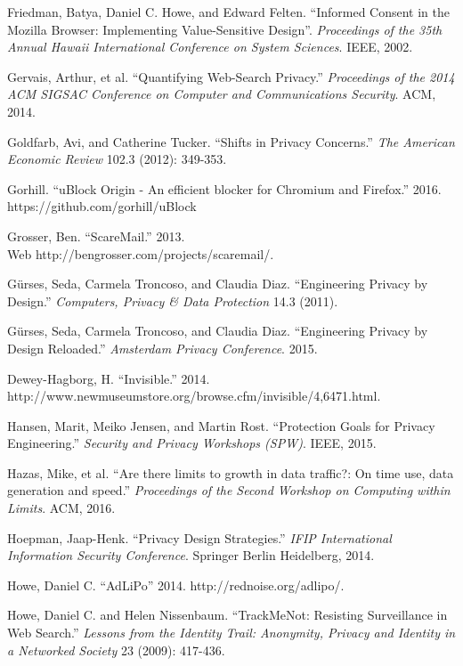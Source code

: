 \documentclass[conference]{IEEEtran}
\begin{document}
\begin{thebibliography}{99}
 Friedman, Batya, Daniel C. Howe, and Edward Felten. “Informed Consent in the Mozilla Browser: Implementing Value-Sensitive Design”. \textit{Proceedings of the 35th Annual Hawaii International Conference on System Sciences}. IEEE, 2002.

 Gervais, Arthur, et al. “Quantifying Web-Search Privacy.” \textit{Proceedings of the 2014 ACM SIGSAC Conference on Computer and Communications Security}. ACM, 2014.

 Goldfarb, Avi, and Catherine Tucker. “Shifts in Privacy Concerns.” \textit{The American Economic Review} 102.3 (2012): 349-353.

 Gorhill. “uBlock Origin - An efficient blocker for Chromium and Firefox.” 2016. https://github.com/gorhill/uBlock

 Grosser, Ben. “ScareMail.” 2013.\\ Web http://bengrosser.com/projects/scaremail/.

 G\"urses, Seda, Carmela Troncoso, and Claudia Diaz. “Engineering Privacy by Design.” \textit{Computers, Privacy \& Data Protection} 14.3 (2011).

 G\"urses, Seda, Carmela Troncoso, and Claudia Diaz. “Engineering Privacy by Design Reloaded.” \textit{Amsterdam Privacy Conference}. 2015.

 Dewey-Hagborg, H. ``Invisible.'' 2014. \\ http://www.newmuseumstore.org/browse.cfm/invisible/4,6471.html.

 Hansen, Marit, Meiko Jensen, and Martin Rost. “Protection Goals for Privacy Engineering.” \textit{Security and Privacy Workshops (SPW)}. IEEE, 2015.

 Hazas, Mike, et al. “Are there limits to growth in data traffic?: On time use, data generation and speed.” \textit{Proceedings of the Second Workshop on Computing within Limits}. ACM, 2016.

 Hoepman, Jaap-Henk. “Privacy Design Strategies.” \textit{IFIP International Information Security Conference}. Springer Berlin Heidelberg, 2014.

 Howe, Daniel C. “AdLiPo” 2014. http://rednoise.org/adlipo/.

 Howe, Daniel C. and Helen Nissenbaum. “TrackMeNot: Resisting Surveillance in Web Search.” \textit{Lessons from the Identity Trail: Anonymity, Privacy and Identity in a Networked Society} 23 (2009): 417-436.


\end{thebibliography}
\end{document}
